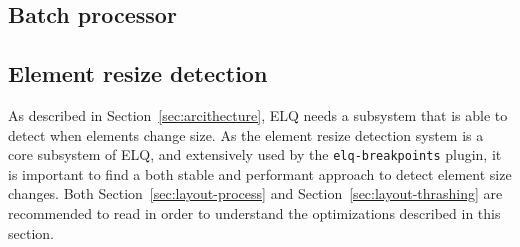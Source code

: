 \documentclass[a4paper,11pt]{kth-mag}
\newcommand{\code}[1]{\texttt{#1}}
\begin{document}
      \subsection{Batch processor}

      \subsection{Element resize detection}\label{sec:imp_erd}
        As described in Section~\ref{sec:arcithecture}, \gls{ELQ} needs a subsystem that is able to detect when elements change size.
        As the element resize detection system is a core subsystem of \gls{ELQ}, and extensively used by the \code{elq-breakpoints} plugin, it is important to find a both stable and performant approach to detect element size changes.
        Both Section~\ref{sec:layout-process} and Section~\ref{sec:layout-thrashing} are recommended to read in order to understand the optimizations described in this section.
\end{document}
